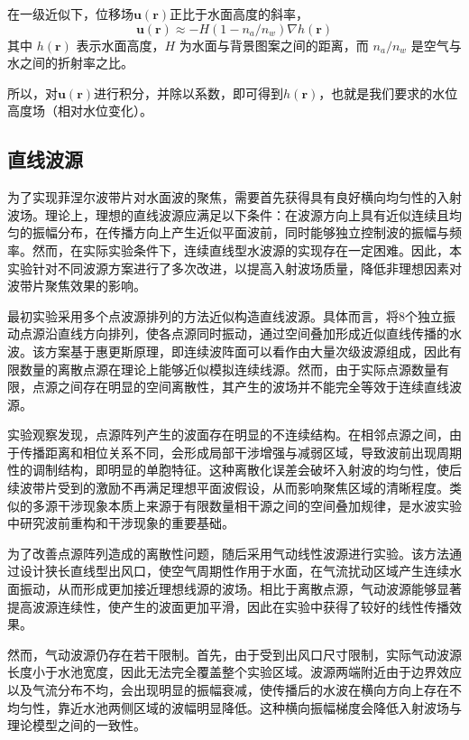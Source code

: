 \documentclass[11pt,a4paper]{ctexart}
\begin{document}
在一级近似下，位移场$\bm{u(r)}$正比于水面高度的斜率，
\begin{equation}
    \bm{u(r)} \approx -H(1-n_a/n_w) \nabla h(\bm{r})
\end{equation}
其中 $h(\bm{r})$ 表示水面高度，$H$ 为水面与背景图案之间的距离，而 $n_a/n_w$ 是空气与水之间的折射率之比。

所以，对$\bm{u(r)}$进行积分，并除以系数，即可得到$h(\bm{r})$，也就是我们要求的水位高度场（相对水位变化）。

\subsection{直线波源}

为了实现菲涅尔波带片对水面波的聚焦，需要首先获得具有良好横向均匀性的入射波场。理论上，理想的直线波源应满足以下条件：在波源方向上具有近似连续且均匀的振幅分布，在传播方向上产生近似平面波前，同时能够独立控制波的振幅与频率。然而，在实际实验条件下，连续直线型水波源的实现存在一定困难。因此，本实验针对不同波源方案进行了多次改进，以提高入射波场质量，降低非理想因素对波带片聚焦效果的影响。

最初实验采用多个点波源排列的方法近似构造直线波源\cite{Che2024STVP}。具体而言，将8个独立振动点源沿直线方向排列，使各点源同时振动，通过空间叠加形成近似直线传播的水波。该方案基于惠更斯原理，即连续波阵面可以看作由大量次级波源组成，因此有限数量的离散点源在理论上能够近似模拟连续线源。然而，由于实际点源数量有限，点源之间存在明显的空间离散性，其产生的波场并不能完全等效于连续直线波源。

实验观察发现，点源阵列产生的波面存在明显的不连续结构。在相邻点源之间，由于传播距离和相位关系不同，会形成局部干涉增强与减弱区域，导致波前出现周期性的调制结构，即明显的单胞特征。这种离散化误差会破坏入射波的均匀性，使后续波带片受到的激励不再满足理想平面波假设，从而影响聚焦区域的清晰程度。类似的多源干涉现象本质上来源于有限数量相干源之间的空间叠加规律，是水波实验中研究波前重构和干涉现象的重要基础。

为了改善点源阵列造成的离散性问题，随后采用气动线性波源进行实验。该方法通过设计狭长直线型出风口，使空气周期性作用于水面，在气流扰动区域产生连续水面振动，从而形成更加接近理想线源的波场。相比于离散点源，气动波源能够显著提高波源连续性，使产生的波面更加平滑，因此在实验中获得了较好的线性传播效果。

然而，气动波源仍存在若干限制。首先，由于受到出风口尺寸限制，实际气动波源长度小于水池宽度，因此无法完全覆盖整个实验区域。波源两端附近由于边界效应以及气流分布不均，会出现明显的振幅衰减，使传播后的水波在横向方向上存在不均匀性，靠近水池两侧区域的波幅明显降低。这种横向振幅梯度会降低入射波场与理论模型之间的一致性。
\end{document}
